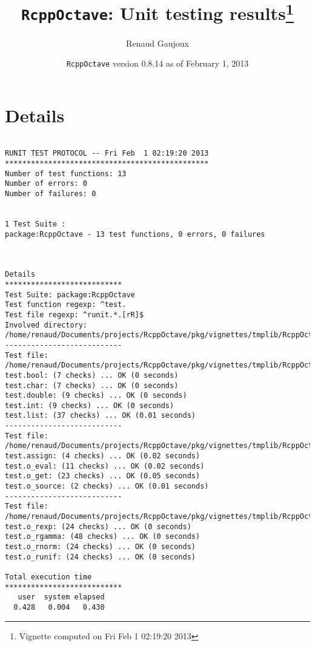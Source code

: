 \documentclass[10pt]{article}
\author{Renaud Gaujoux}
\title{\texttt{RcppOctave}: Unit testing results\footnote{Vignette computed  on Fri Feb  1 02:19:20 2013}}
\date{\texttt{RcppOctave} version 0.8.14 as of February  1, 2013}
\begin{document}
\maketitle

\section{Details}
\begin{verbatim}

RUNIT TEST PROTOCOL -- Fri Feb  1 02:19:20 2013 
*********************************************** 
Number of test functions: 13 
Number of errors: 0 
Number of failures: 0 

 
1 Test Suite : 
package:RcppOctave - 13 test functions, 0 errors, 0 failures



Details 
*************************** 
Test Suite: package:RcppOctave 
Test function regexp: ^test. 
Test file regexp: ^runit.*.[rR]$ 
Involved directory: 
/home/renaud/Documents/projects/RcppOctave/pkg/vignettes/tmplib/RcppOctave/unitTests 
--------------------------- 
Test file: /home/renaud/Documents/projects/RcppOctave/pkg/vignettes/tmplib/RcppOctave/unitTests/runit.conversions.R 
test.bool: (7 checks) ... OK (0 seconds)
test.char: (7 checks) ... OK (0 seconds)
test.double: (9 checks) ... OK (0 seconds)
test.int: (9 checks) ... OK (0 seconds)
test.list: (37 checks) ... OK (0.01 seconds)
--------------------------- 
Test file: /home/renaud/Documents/projects/RcppOctave/pkg/vignettes/tmplib/RcppOctave/unitTests/runit.eval.R 
test.assign: (4 checks) ... OK (0.02 seconds)
test.o_eval: (11 checks) ... OK (0.02 seconds)
test.o_get: (23 checks) ... OK (0.05 seconds)
test.o_source: (2 checks) ... OK (0.01 seconds)
--------------------------- 
Test file: /home/renaud/Documents/projects/RcppOctave/pkg/vignettes/tmplib/RcppOctave/unitTests/runit.stats.R 
test.o_rexp: (24 checks) ... OK (0 seconds)
test.o_rgamma: (48 checks) ... OK (0 seconds)
test.o_rnorm: (24 checks) ... OK (0 seconds)
test.o_runif: (24 checks) ... OK (0 seconds)

Total execution time
***************************
   user  system elapsed 
  0.428   0.004   0.430 

\end{verbatim}
\end{document}
